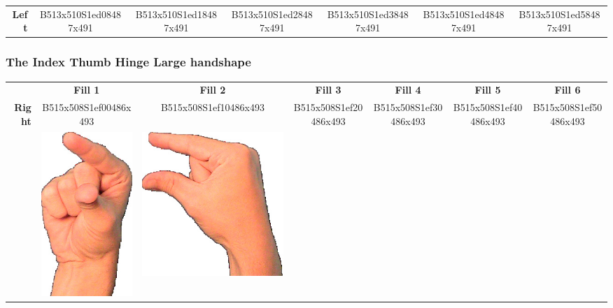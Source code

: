 \documentclass{article}
\begin{document}
\begin{center}
\begin{tabular}{r*{6}{c}}
\textbf{Left}&
B513x510S1ed08487x491&
B513x510S1ed18487x491&
B513x510S1ed28487x491&
B513x510S1ed38487x491&
B513x510S1ed48487x491&
B513x510S1ed58487x491\\
\end{tabular}
\end{center}

\subsubsection{The Index Thumb Hinge Large handshape}

\begin{center}
\begin{tabular}{r*{6}{c}}
&\textbf{Fill 1}&\textbf{Fill 2}&\textbf{Fill 3}&\textbf{Fill 4}&\textbf{Fill 5}&\textbf{Fill 6}\\
\multirow{2}{*}{\textbf{Right}}&
B515x508S1ef00486x493&
B515x508S1ef10486x493&
B515x508S1ef20486x493&
B515x508S1ef30486x493&
B515x508S1ef40486x493&
B515x508S1ef50486x493\\
&
\includegraphics[scale=0.1]{images/09-12-1.jpg}&
\includegraphics[scale=0.1]{images/09-12-2.jpg}&

\end{tabular}
\end{center}
\end{document}
